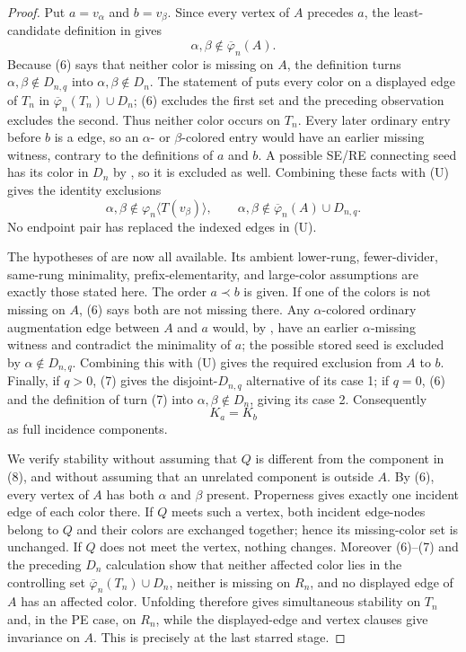 \begin{proof}
Put $a=v_\alpha$ and $b=v_\beta$.  Since every vertex of $A$ precedes
$a$, the least-candidate definition in
 gives
\[
             \alpha,\beta\notin\overline\varphi_n(A).         \tag{6}
\]
Because (6) says that neither color is missing on $A$, the definition
 turns
$\alpha,\beta\notin D_{n,q}$ into
$\alpha,\beta\notin D_n$.  The statement of
 puts every color on a displayed edge
of $T_n$ in $\overline\varphi_n(T_n)\cup D_n$; (6) excludes the first
set and the preceding observation excludes the second.  Thus neither
color occurs on $T_n$.  Every later ordinary entry before $b$ is a
 edge, so an $\alpha$- or
$\beta$-colored entry would have an earlier missing witness, contrary to
the definitions of $a$ and $b$.  A possible SE/RE connecting seed has
its color in $D_n$ by , so it is excluded
as well.  Combining these facts with (U) gives the identity exclusions
\[
 \alpha,\beta\notin\varphi_n\langle T(v_\beta)\rangle,
 \qquad
 \alpha,\beta\notin
   \overline\varphi_n(A)\cup D_{n,q}.                         \tag{7}
\]
No endpoint pair has replaced the indexed edges in (U).

The hypotheses of  are now all available.  Its
ambient lower-rung, fewer-divider, same-rung minimality, prefix-elementarity, and
large-color assumptions are exactly those stated here.  The order
$a\prec b$ is given.  If one of the colors is not missing on $A$, (6)
says both are not missing there.  Any $\alpha$-colored ordinary
augmentation edge between $A$ and $a$ would, by
, have an earlier $\alpha$-missing
witness and contradict the minimality of $a$; the possible stored seed
is excluded by $\alpha\notin D_{n,q}$.  Combining this with (U) gives
the required exclusion from $A$ to $b$.  Finally, if $q>0$, (7) gives the
disjoint-$D_{n,q}$ alternative of its case 1; if $q=0$, (6) and the
definition of  turn (7) into
$\alpha,\beta\notin D_n$, giving its case 2.  Consequently
\[
 K_a=K_b                                                       \tag{8}
\]
as full incidence components.

We verify stability without assuming that $Q$ is different from the
component in (8), and without assuming that an unrelated component is
outside $A$.  By (6), every vertex of $A$ has both $\alpha$ and $\beta$
present.  Properness gives exactly one incident edge of each color
there.  If $Q$ meets such a vertex, both incident edge-nodes belong to
$Q$ and their colors are exchanged together; hence its missing-color
set is unchanged.  If $Q$ does not meet the vertex, nothing changes.
Moreover (6)--(7) and the preceding $D_n$ calculation show that neither
affected color lies in the controlling set
$\overline\varphi_n(T_n)\cup D_n$, neither is missing on $R_n$, and no
displayed edge of $A$ has an affected color.  Unfolding
 therefore gives simultaneous stability on
$T_n$ and, in the PE case, on $R_n$, while the displayed-edge and vertex
clauses give invariance on $A$.  This is precisely
 at the last starred stage.


\end{proof}
